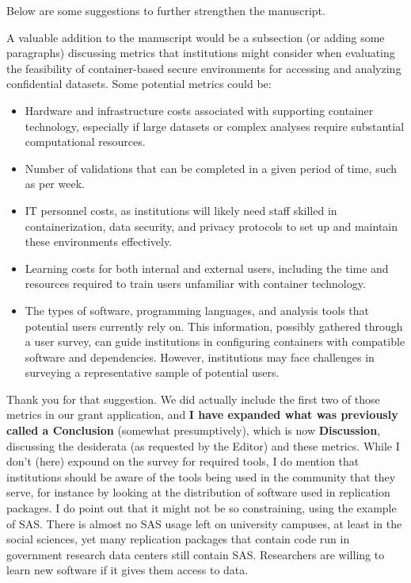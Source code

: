 \begin{referee}

Below are some suggestions to further strengthen the manuscript.

A valuable addition to the manuscript would be a subsection (or adding some paragraphs) discussing metrics that institutions might consider when evaluating the feasibility of container-based secure environments for accessing and analyzing confidential datasets.  Some potential metrics could be:
    \begin{itemize}
        \item Hardware and infrastructure costs associated with supporting container technology, especially if large datasets or complex analyses require substantial computational resources. 
        \item Number of validations that can be completed in a given period of time, such as per week. 
        \item IT personnel costs, as institutions will likely need staff skilled in containerization, data security, and privacy protocols to set up and maintain these environments effectively. 
        \item Learning costs for both internal and external users, including the time and resources required to train users unfamiliar with container technology. 
        \item The types of software, programming languages, and analysis tools that potential users currently rely on.  This information, possibly gathered through a user survey, can guide institutions in configuring containers with compatible software and dependencies. However, institutions may face challenges in surveying a representative sample of potential users. 
    \end{itemize}

\end{referee}

\begin{response}
    Thank you for that suggestion. We did actually include the first two of those metrics in our grant application, and \textbf{I have expanded what was previously called a Conclusion} (somewhat presumptively), which is now \textbf{Discussion}, discussing the desiderata (as requested by the Editor) and these metrics. While I don't (here) expound on the survey for required tools, I do mention that institutions should be aware of the tools being used in the community that they serve, for instance by looking at the distribution of software used in replication packages. I do point out that it might not be so constraining, using the example of SAS. There is almost no SAS usage left on university campuses, at least in the social sciences, yet many replication packages that contain code run in government research data centers still contain SAS. Researchers are willing to learn new software if it gives them access to data.
\end{response}

